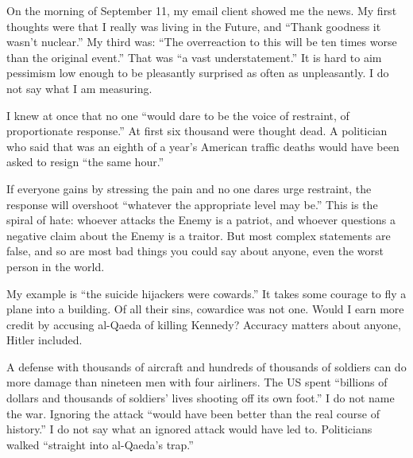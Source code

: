 
On the morning of September 11, my email client showed me the news. My first thoughts were that I really was living in the Future, and ``Thank goodness it wasn't nuclear.'' My third was: ``The overreaction to this will be ten times worse than the original event.'' That was ``a vast understatement.'' It is hard to aim pessimism low enough to be pleasantly surprised as often as unpleasantly. I do not say what I am measuring. 

I knew at once that no one ``would dare to be the voice of restraint, of proportionate response.'' At first six thousand were thought dead. A politician who said that was an eighth of a year's American traffic deaths would have been asked to resign ``the same hour.'' 

If everyone gains by stressing the pain and no one dares urge restraint, the response will overshoot ``whatever the appropriate level may be.'' This is the spiral of hate: whoever attacks the Enemy is a patriot, and whoever questions a negative claim about the Enemy is a traitor. But most complex statements are false, and so are most bad things you could say about anyone, even the worst person in the world.

My example is ``the suicide hijackers were cowards.'' It takes some courage to fly a plane into a building. Of all their sins, cowardice was not one. Would I earn more credit by accusing al-Qaeda of killing Kennedy?  Accuracy matters about anyone, Hitler included.

A defense with thousands of aircraft and hundreds of thousands of soldiers can do more damage than nineteen men with four airliners. The US spent ``billions of dollars and thousands of soldiers' lives shooting off its own foot.'' I do not name the war. Ignoring the attack ``would have been better than the real course of history.'' I do not say what an ignored attack would have led to. Politicians walked ``straight into al-Qaeda's trap.'' 

